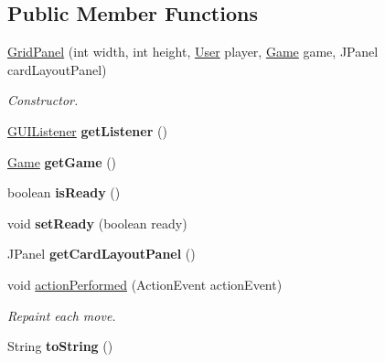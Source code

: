 \subsection*{Public Member Functions}
\begin{DoxyCompactItemize}
\item 
\hyperlink{classGridPanel_af8bf9b3bb5b5548a39f97371848e0ac7}{Grid\+Panel} (int width, int height, \hyperlink{classUser}{User} player, \hyperlink{classGame}{Game} game, J\+Panel card\+Layout\+Panel)
\begin{DoxyCompactList}\small\item\em Constructor. \end{DoxyCompactList}\item 
\hyperlink{classGUIListener}{G\+U\+I\+Listener} {\bfseries get\+Listener} ()\hypertarget{classGridPanel_a297c91de7bf845e66bd2ae03c1635950}{}\label{classGridPanel_a297c91de7bf845e66bd2ae03c1635950}

\item 
\hyperlink{classGame}{Game} {\bfseries get\+Game} ()\hypertarget{classGridPanel_a2eb320db357aef01be7b27ecf045bbbf}{}\label{classGridPanel_a2eb320db357aef01be7b27ecf045bbbf}

\item 
boolean {\bfseries is\+Ready} ()\hypertarget{classGridPanel_aae632b11eaed927afd5884f99a5870f8}{}\label{classGridPanel_aae632b11eaed927afd5884f99a5870f8}

\item 
void {\bfseries set\+Ready} (boolean ready)\hypertarget{classGridPanel_a09c32b26eae81ac799aa95e28aae194f}{}\label{classGridPanel_a09c32b26eae81ac799aa95e28aae194f}

\item 
J\+Panel {\bfseries get\+Card\+Layout\+Panel} ()\hypertarget{classGridPanel_a1a8601fc7d4f8175c7aebd6bec8ec6f9}{}\label{classGridPanel_a1a8601fc7d4f8175c7aebd6bec8ec6f9}

\item 
void \hyperlink{classGridPanel_a38f9375b4ed14fa70edaa859b0ed43e6}{action\+Performed} (Action\+Event action\+Event)\hypertarget{classGridPanel_a38f9375b4ed14fa70edaa859b0ed43e6}{}\label{classGridPanel_a38f9375b4ed14fa70edaa859b0ed43e6}

\begin{DoxyCompactList}\small\item\em Repaint each move. \end{DoxyCompactList}\item 
String {\bfseries to\+String} ()\hypertarget{classGridPanel_a7dbc1ff2bf786538707f479837ce2792}{}\label{classGridPanel_a7dbc1ff2bf786538707f479837ce2792}

\end{DoxyCompactItemize}
